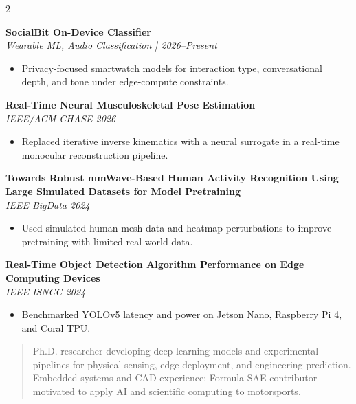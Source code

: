 \documentclass[9pt,letterpaper,ragged2e,withhyper]{../asset/altacv}
\newcommand{\compactdivider}{%
  \par\noindent\textcolor{body!30}{\hdashrule{\linewidth}{0.4pt}{0.5ex}}\par
}
\begin{document}
\begin{paracol}{2}
\compactdivider
\textbf{SocialBit On-Device Classifier}\\
\textit{Wearable ML, Audio Classification | 2026--Present}\\
\begin{itemize}
\item Privacy-focused smartwatch models for interaction type, conversational depth, and tone under edge-compute constraints.
\end{itemize}


\textbf{Real-Time Neural Musculoskeletal Pose Estimation}\\
\textit{IEEE/ACM CHASE 2026}
\begin{itemize}
\item Replaced iterative inverse kinematics with a neural surrogate in a real-time monocular reconstruction pipeline.
\end{itemize}

\divider

\textbf{Towards Robust mmWave-Based Human Activity Recognition Using Large Simulated Datasets for Model Pretraining}\\
\textit{IEEE BigData 2024}
\begin{itemize}
\item Used simulated human-mesh data and heatmap perturbations to improve pretraining with limited real-world data.
\end{itemize}

\divider

\textbf{Real-Time Object Detection Algorithm Performance on Edge Computing Devices}\\
\textit{IEEE ISNCC 2024}
\begin{itemize}
\item Benchmarked YOLOv5 latency and power on Jetson Nano, Raspberry Pi 4, and Coral TPU.
\end{itemize}

\switchcolumn
\fontsize{10pt}{12pt}\selectfont


\begin{quote}
Ph.D. researcher developing deep-learning models and experimental pipelines for physical sensing, edge deployment, and engineering prediction. Embedded-systems and CAD experience; Formula SAE contributor motivated to apply AI and scientific computing to motorsports.
\end{quote}


\end{paracol}
\end{document}
